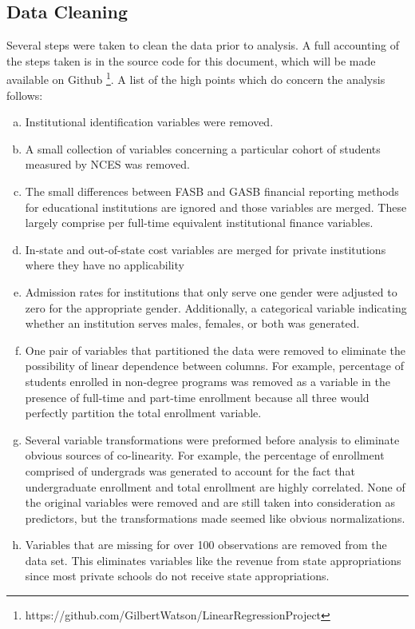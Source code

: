 \documentclass{article}
\begin{document}
\subsection{Data Cleaning}

Several steps were taken to clean the data prior to analysis. A full accounting of the steps taken is in the source code for this document, which will be made available on Github \footnote{https://github.com/GilbertWatson/LinearRegressionProject}. A list of the high points which do concern the analysis follows:

\begin{enumerate}[a)]
\item{} Institutional identification variables were removed.
\item{} A small collection of variables concerning a particular cohort of students measured by NCES was removed.
\item{} The small differences between FASB and GASB financial reporting methods for educational institutions are ignored and those variables are merged. These largely comprise per full-time equivalent institutional finance variables.
\item{} In-state and out-of-state cost variables are merged for private institutions where they have no applicability
\item{} Admission rates for institutions that only serve one gender were adjusted to zero for the appropriate gender. Additionally, a categorical variable indicating whether an institution serves males, females, or both was generated.
\item{} One pair of variables that partitioned the data were removed to eliminate the possibility of linear dependence between columns. For example, percentage of students enrolled in non-degree programs was removed as a variable in the presence of full-time and part-time enrollment because all three would perfectly partition the total enrollment variable.
\item{} Several variable transformations were preformed before analysis to eliminate obvious sources of co-linearity. For example, the percentage of enrollment comprised of undergrads was generated to account for the fact that undergraduate enrollment and total enrollment are highly correlated. None of the original variables were removed and are still taken into consideration as predictors, but the transformations made seemed like obvious normalizations.
\item{} Variables that are missing for over 100 observations are removed from the data set. This eliminates variables like the revenue from state appropriations since most private schools do not receive state appropriations.
\end{enumerate}
\end{document}

